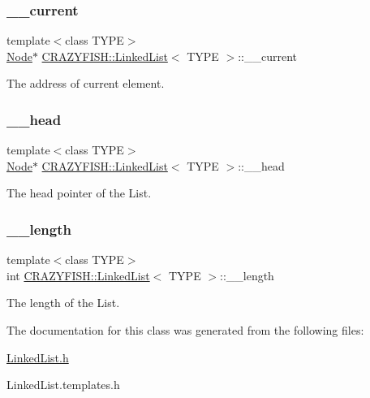 \subsubsection{\texorpdfstring{\+\_\+\+\_\+current}{\_\_current}}
{\footnotesize\ttfamily template$<$class T\+Y\+PE$>$ \\
\hyperlink{classCRAZYFISH_1_1LinkedList_1_1Node}{Node}$\ast$ \hyperlink{classCRAZYFISH_1_1LinkedList}{C\+R\+A\+Z\+Y\+F\+I\+S\+H\+::\+Linked\+List}$<$ T\+Y\+PE $>$\+::\+\_\+\+\_\+current\hspace{0.3cm}{\ttfamily [private]}}

The address of current element. \mbox{\label{classCRAZYFISH_1_1LinkedList_a1439d0f5f10624ffd090cdec5430390d}} 
\subsubsection{\texorpdfstring{\+\_\+\+\_\+head}{\_\_head}}
{\footnotesize\ttfamily template$<$class T\+Y\+PE$>$ \\
\hyperlink{classCRAZYFISH_1_1LinkedList_1_1Node}{Node}$\ast$ \hyperlink{classCRAZYFISH_1_1LinkedList}{C\+R\+A\+Z\+Y\+F\+I\+S\+H\+::\+Linked\+List}$<$ T\+Y\+PE $>$\+::\+\_\+\+\_\+head\hspace{0.3cm}{\ttfamily [private]}}

The head pointer of the List. \mbox{\label{classCRAZYFISH_1_1LinkedList_afe0f4aa3de15119600fd14c4a6ed3fc1}} 
\subsubsection{\texorpdfstring{\+\_\+\+\_\+length}{\_\_length}}
{\footnotesize\ttfamily template$<$class T\+Y\+PE$>$ \\
int \hyperlink{classCRAZYFISH_1_1LinkedList}{C\+R\+A\+Z\+Y\+F\+I\+S\+H\+::\+Linked\+List}$<$ T\+Y\+PE $>$\+::\+\_\+\+\_\+length\hspace{0.3cm}{\ttfamily [private]}}

The length of the List. 

The documentation for this class was generated from the following files\+:\begin{DoxyCompactItemize}
\item 
\hyperlink{LinkedList_8h}{Linked\+List.\+h}\item 
Linked\+List.\+templates.\+h\end{DoxyCompactItemize}
